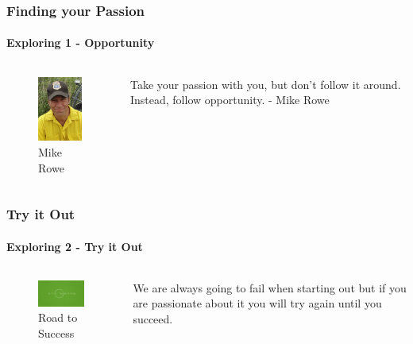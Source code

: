 \documentclass[aspectratio=169]{beamer}
\begin{document}
\begin{frame}
  \frametitle{Finding your Passion}
  \framesubtitle{Exploring 1 - Opportunity}
  \begin{columns}[onlytextwidth]
    \begin{column}{.30\textwidth}
      \begin{figure}
        \includegraphics[width=4cm,keepaspectratio]{mike_rowe}
        \caption{Mike Rowe}
      \end{figure}
    \end{column}
    \hfill
    \begin{column}{.60\textwidth}
        \begin{tcolorbox}[title=mike\_rowe.log,colback=gray]
          Take your passion with you, but don't follow it around. Instead, follow opportunity. - Mike Rowe
        \end{tcolorbox}
    \end{column}
  \end{columns}
\end{frame}

\begin{frame}
  \frametitle{Try it Out}
  \framesubtitle{Exploring 2 - Try it Out}
  \begin{columns}[onlytextwidth]
    \begin{column}{.30\textwidth}
      \begin{figure}
        \includegraphics[width=5.5cm,keepaspectratio]{try_fail_success}
        \caption{Road to Success}
      \end{figure}
    \end{column}
    \hfill
    \begin{column}{.60\textwidth}
        \begin{tcolorbox}[title=success.log,colback=gray]
          We are always going to fail when starting out but if you are passionate about it you will try again until you succeed.
        \end{tcolorbox}
    \end{column}
  \end{columns}
\end{frame}
\end{document}
